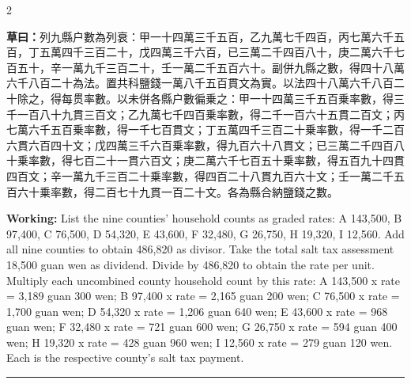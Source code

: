 \documentclass[11pt,a4paper]{article}
\newcommand{\longline}{\noindent\rule{\textwidth}{0.4pt}}
\newcommand{\WorkingText}[1]{\par\noindent\textbf{草曰：}#1\par}
\newcommand{\WorkingEn}[1]{\par\noindent\textbf{Working:} #1\par}
\begin{document}
\begin{paracol}{2}
\WorkingText{列九縣户數為列衰：甲一十四萬三千五百，乙九萬七千四百，丙七萬六千五百，丁五萬四千三百二十，戊四萬三千六百，已三萬二千四百八十，庚二萬六千七百五十，辛一萬九千三百二十，壬一萬二千五百六十。副併九縣之數，得四十八萬六千八百二十為法。置共科鹽錢一萬八千五百貫文為實。以法四十八萬六千八百二十除之，得每贯率數。以未併各縣户數徧乗之：甲一十四萬三千五百乗率數，得三千一百八十九貫三百文；乙九萬七千四百乗率數，得二千一百六十五貫二百文；丙七萬六千五百乗率數，得一千七百貫文；丁五萬四千三百二十乗率數，得一千二百六貫六百四十文；戊四萬三千六百乗率數，得九百六十八貫文；已三萬二千四百八十乗率數，得七百二十一貫六百文；庚二萬六千七百五十乗率數，得五百九十四貫四百文；辛一萬九千三百二十乗率數，得四百二十八貫九百六十文；壬一萬二千五百六十乗率數，得二百七十九貫一百二十文。各為縣合納鹽錢之數。}
\switchcolumn
\WorkingEn{List the nine counties' household counts as graded rates: A 143,500, B 97,400, C 76,500, D 54,320, E 43,600, F 32,480, G 26,750, H 19,320, I 12,560. Add all nine counties to obtain 486,820 as divisor. Take the total salt tax assessment 18,500 guan wen as dividend. Divide by 486,820 to obtain the rate per unit. Multiply each uncombined county household count by this rate: A 143,500 x rate = 3,189 guan 300 wen; B 97,400 x rate = 2,165 guan 200 wen; C 76,500 x rate = 1,700 guan wen; D 54,320 x rate = 1,206 guan 640 wen; E 43,600 x rate = 968 guan wen; F 32,480 x rate = 721 guan 600 wen; G 26,750 x rate = 594 guan 400 wen; H 19,320 x rate = 428 guan 960 wen; I 12,560 x rate = 279 guan 120 wen. Each is the respective county's salt tax payment.}

\end{paracol}

\longline
\end{document}
